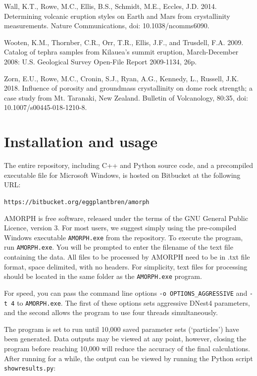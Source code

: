 \documentclass[review]{elsarticle}
\begin{document}
\begin{thebibliography}{99}
Wall, K.T., Rowe, M.C., Ellis, B.S., Schmidt, M.E., Eccles, J.D. 2014. Determining volcanic eruption styles on Earth and Mars from crystallinity measurements. Nature Communications, doi: 10.1038/ncomms6090.

Wooten, K.M., Thornber, C.R., Orr, T.R., Ellis, J.F., and Trusdell, F.A. 2009. Catalog of tephra samples from Kilauea's summit eruption, March-December 2008: U.S. Geological Survey Open-File Report 2009-1134, 26p.

Zorn, E.U., Rowe, M.C., Cronin, S.J., Ryan, A.G., Kennedy, L., Russell, J.K. 2018. Influence of porosity and groundmass crystallinity on dome rock strength; a case study from Mt. Taranaki, New Zealand. Bulletin of Volcanology, 80:35, doi: 10.1007/s00445-018-1210-8.

\end{thebibliography}

\appendix
\section{Installation and usage}\label{sec:program}

The entire repository, including C++ and Python source code, and a 
precompiled executable file for Microsoft Windows,
is hosted on Bitbucket at the following URL:

\vspace{1em}
{\tt https://bitbucket.org/eggplantbren/amorph}
\vspace{1em}

AMORPH is free software, released under the terms of the GNU General Public
Licence, version 3.
For most users, we suggest simply using the pre-compiled Windows executable
{\tt AMORPH.exe} from the repository. To execute the program,
run {\tt AMORPH.exe}. You will be prompted to enter the filename of the text
file containing the data. All files to be processed by AMORPH need to be in .txt file format, space delimited, with no headers. For simplicity, text files for processing should be located in the same folder as the {\tt AMORPH.exe} program.

For speed, you can pass the command line options {\tt -o OPTIONS\_AGGRESSIVE} and
{\tt -t 4} to {\tt AMORPH.exe}. The first of these options sets aggressive
DNest4 parameters, and the second allows the program to use four threads
simultaneously.

The program is set to run until 10,000 saved parameter sets
(`particles') have been generated. Data outputs may be viewed at any point, however, closing the program before reaching  10,000 will reduce the accuracy of the final calculations. After running for a while, the output can be viewed
by running the Python script {\tt showresults.py}:
\end{document}
